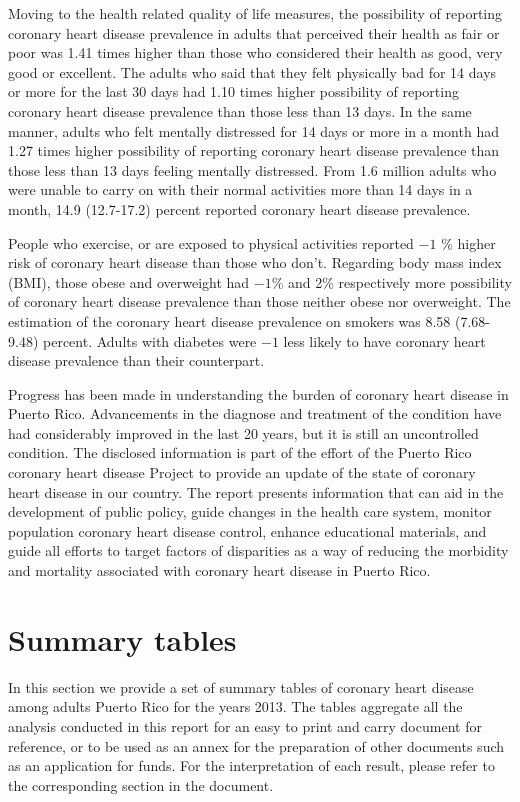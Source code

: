 Moving to the health related quality of life measures, the possibility of reporting coronary heart disease prevalence in adults that perceived their health as fair or poor was 1.41 times higher than those who considered their health as good, very good or excellent. The adults who said that they felt physically bad for 14 days or more for the last 30 days had 1.10 times higher possibility of reporting coronary heart disease prevalence than those less than 13 days. In the same manner, adults who felt mentally distressed for 14 days or more in a month had 1.27 times higher possibility of reporting coronary heart disease prevalence than those less than 13 days feeling mentally distressed. From 1.6 million adults who were unable to carry on with their normal activities more than 14 days in a month, 14.9 (12.7-17.2) percent reported coronary heart disease prevalence. 

People who exercise, or are exposed to physical activities reported \ensuremath{-1} \% higher risk of coronary heart disease than those who don't.  Regarding body mass index (BMI), those obese and overweight had \ensuremath{-1}\% and 2\% respectively more possibility of coronary heart disease prevalence than those neither obese nor overweight. The estimation of the coronary heart disease prevalence on smokers was 8.58 (7.68-9.48) percent.  Adults with diabetes were \ensuremath{-1}\5 less likely to have coronary heart disease prevalence than their counterpart.



Progress has been made in understanding the burden of coronary heart disease in Puerto Rico. Advancements in the diagnose and treatment of the condition have had considerably improved in the last 20 years, but it is still an uncontrolled condition. The disclosed information is part of the effort of the Puerto Rico coronary heart disease Project to provide an update of the state of coronary heart disease in our country. The report presents information that can aid in the development of public policy, guide changes in the health care system, monitor population coronary heart disease control, enhance educational materials, and guide all efforts to target factors of disparities as a way of reducing the morbidity and mortality associated with coronary heart disease in Puerto Rico.

\newpage
\section{Summary tables}
In this section we provide a set of summary tables of coronary heart disease among adults Puerto Rico for the years 2013. The tables aggregate all the analysis conducted in this report for an easy to print and carry document for reference, or to be used as an annex for the preparation of other documents such as an application for funds. For the interpretation of each result, please refer to the corresponding section in the document.

